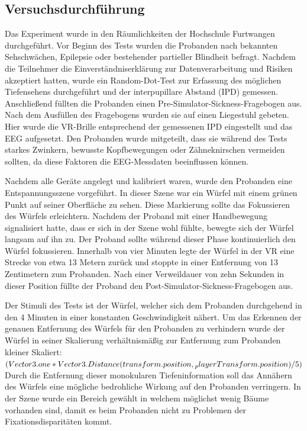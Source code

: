 \documentclass[conference]{IEEEtran}
\begin{document}
\subsection{Versuchsdurchführung}
Das Experiment wurde in den Räumlichkeiten der Hochschule Furtwangen durchgeführt. Vor Beginn des Tests wurden die Probanden nach bekannten Sehschwächen, Epilepsie oder bestehender partieller Blindheit befragt. Nachdem die Teilnehmer die Einverständniserklärung zur Datenverarbeitung und Risiken akzeptiert hatten, wurde ein Random-Dot-Test zur Erfassung des möglichen Tiefensehens durchgeführt und der interpupillare Abstand (IPD) gemessen. Anschließend füllten die Probanden einen Pre-Simulator-Sickness-Fragebogen aus. Nach dem Ausfüllen des Fragebogens wurden sie auf einen Liegestuhl gebeten. Hier wurde die VR-Brille entsprechend der gemessenen IPD eingestellt und das EEG aufgesetzt. Den Probanden wurde mitgeteilt, dass sie während des Tests starkes Zwinkern, bewusste Kopfbewegungen oder Zähneknirschen vermeiden sollten, da diese Faktoren die EEG-Messdaten beeinflussen können.

Nachdem alle Geräte angelegt und kalibriert waren, wurde den Probanden eine Entspannungsszene vorgeführt. In dieser Szene war ein Würfel mit einem grünen Punkt auf seiner Oberfläche zu sehen. Diese Markierung sollte das Fokussieren des Würfels erleichtern. Nachdem der Proband mit einer Handbewegung signalisiert hatte, dass er sich in der Szene wohl fühlte, bewegte sich der Würfel langsam auf ihn zu. Der Proband sollte während dieser Phase kontinuierlich den Würfel fokussieren. Innerhalb von vier Minuten legte der Würfel in der VR eine Strecke von etwa 13 Metern zurück und stoppte in einer Entfernung von 13 Zentimetern zum Probanden. Nach einer Verweildauer von zehn Sekunden in dieser Position füllte der Proband den Post-Simulator-Sickness-Fragebogen aus.

Der Stimuli des Tests ist der Würfel, welcher sich dem Probanden durchgehend in den 4 Minuten in einer konstanten Geschwindigkeit nähert. Um das Erkennen der genauen Entfernung des Würfels für den Probanden zu verhindern wurde der Würfel in seiner Skalierung verhältnismäßig zur Entfernung zum Probanden kleiner Skaliert: 
$(Vector3.one*Vector3.Distance(transform.position,\\_playerTransform.position)/5)$\\
Durch die Entfernung dieser monokularen Tiefeninformation soll das Annähern des Würfels eine mögliche bedrohliche Wirkung auf den Probanden verringern. In der Szene wurde ein Bereich gewählt in welchem möglichst wenig Bäume  vorhanden sind, damit es beim Probanden nicht zu Problemen der Fixationsdisparitäten kommt.
\end{document}
